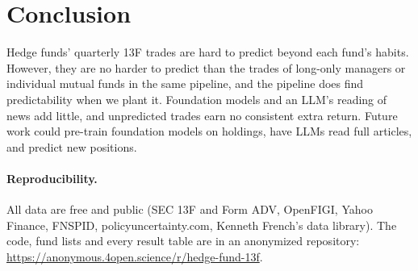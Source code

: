 \section{Conclusion}

Hedge funds' quarterly 13F trades are hard to predict beyond each fund's
habits. However, they are no harder to predict than the trades of long-only
managers or individual mutual funds in the same pipeline, and the pipeline
does find predictability when we plant it. Foundation models and an LLM's
reading of news add little, and unpredicted trades earn no consistent extra
return. Future work could pre-train foundation models on holdings, have LLMs
read full articles, and predict new positions.

\paragraph{Reproducibility.} All data are free and public (SEC 13F and Form
ADV, OpenFIGI, Yahoo Finance, FNSPID, policyuncertainty.com, Kenneth French's
data library). The code, fund lists and every result table are in an anonymized
repository: \url{https://anonymous.4open.science/r/hedge-fund-13f}.

